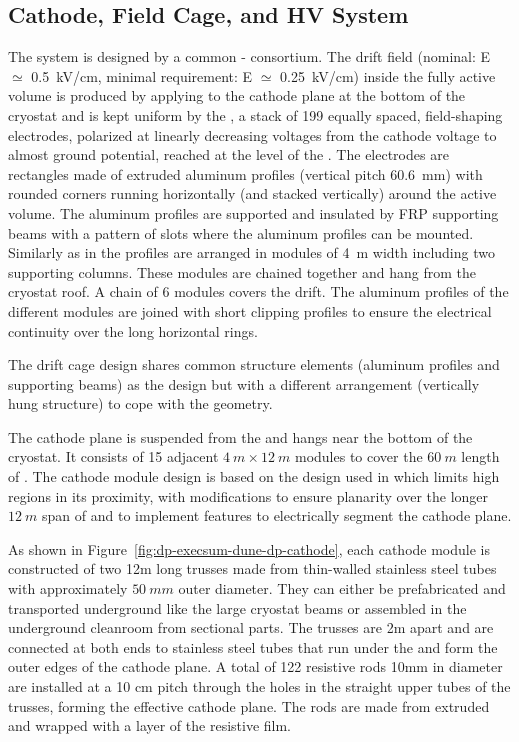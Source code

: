 \subsection{Cathode, Field Cage, and HV System}
\label{sec:dp-execsum-cathode}

The  system is designed by a common - consortium.
The drift field (nominal: E ${\simeq}$ \SI{0.5}{kV/cm}, minimal requirement: E ${\simeq}$ \SI{0.25}{kV/cm}) inside the fully active  volume is produced by applying  to the cathode plane at the bottom of the cryostat and is kept uniform by the , a stack of \num{199} equally spaced, field-shaping electrodes,  polarized at linearly decreasing voltages from the cathode  voltage to almost ground potential, reached at the level of the . The electrodes are rectangles made of extruded aluminum profiles (vertical pitch \SI{60.6}{mm}) with rounded corners running horizontally (and stacked vertically) around the active volume. The aluminum profiles are supported and insulated by FRP supporting beams with a pattern of slots where the aluminum profiles can be mounted. Similarly as in  the profiles are arranged in modules of \SI{4}{m} width including two  supporting columns. These modules are chained together and  hang from the cryostat roof. A chain of \num{6} modules covers the \dpmaxdrift drift. The aluminum profiles of the different modules are joined with short clipping profiles to ensure the electrical continuity over the \dptpclen long horizontal rings. 

The drift cage design shares common structure elements (aluminum profiles and  supporting beams) as the   design but with a different arrangement (vertically hung structure) to cope with the  geometry.

The cathode plane  is suspended from the  and hangs near the  bottom of the cryostat. It consists of 15 adjacent $4~m \times 12~m$ modules to cover the $60~m$ length of . The cathode module design is based on the design used in  which limits high \efield
regions in its proximity, with modifications to ensure planarity over the longer $12~m$ span of  and to implement features to electrically segment the cathode plane.

As shown in  Figure~\ref{fig:dp-execsum-dune-dp-cathode}, each cathode module is constructed of two 12m long trusses made from thin-walled stainless steel tubes with approximately $50~mm$ outer diameter. They can either be prefabricated and transported underground like the large cryostat beams or assembled in the underground cleanroom from sectional parts. The trusses are 2m apart and are connected at both ends to stainless steel tubes that run under the  and form the outer edges of the cathode plane. A total of 122 resistive rods 10mm in diameter are installed at a 10 cm pitch through the holes in the straight upper tubes of the trusses, forming the effective cathode plane. The rods are made from extruded  and wrapped with a layer of the resistive film.

